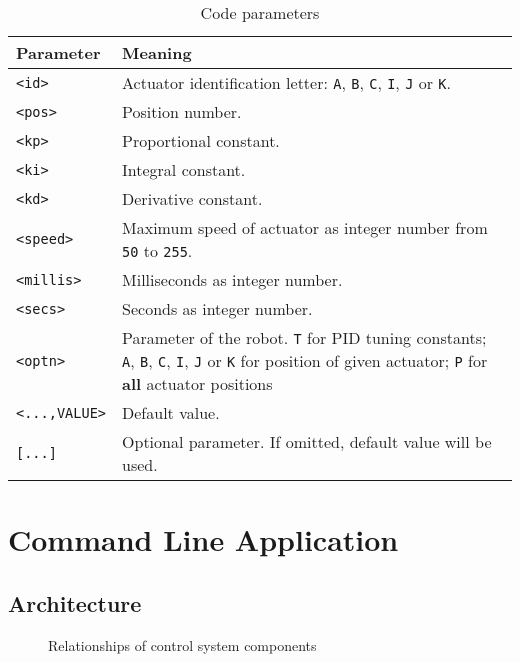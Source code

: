 \begingroup
\setlength{\tabcolsep}{10pt}
\renewcommand{\arraystretch}{1.5}
\begin{table}[h]
    \centering
    \caption{Code parameters}
    \label{tab:code-parameters}
    \begin{tabular}{p{}p{}}
    \toprule
    Parameter & Meaning \\ \midrule
    \texttt{<id>} & Actuator identification letter: \texttt{A}, \texttt{B}, \texttt{C}, \texttt{I}, \texttt{J} or \texttt{K}. \\
    \texttt{<pos>} & Position number. \\
    \texttt{<kp>} & Proportional constant. \\
    \texttt{<ki>} & Integral constant. \\
    \texttt{<kd>} & Derivative constant. \\
    \texttt{<speed>} & Maximum speed of actuator as integer number from \texttt{50} to \texttt{255}. \\
    \texttt{<millis>} & Milliseconds as integer number. \\
    \texttt{<secs>} & Seconds as integer number. \\
    \texttt{<optn>} & Parameter of the robot. \texttt{T} for PID tuning constants; \texttt{A}, \texttt{B}, \texttt{C}, \texttt{I}, \texttt{J} or \texttt{K} for position of given actuator; \texttt{P} for \textbf{all} actuator positions\\
    \texttt{<...,VALUE>} & Default value. \\
    \texttt{[...]} & Optional parameter. If omitted, default value will be used. \\
    \bottomrule
    \end{tabular}
\end{table}
\endgroup

\section{Command Line Application}

\subsection{Architecture}

\begin{figure}[]
    \centering
    
    \caption{Relationships of control system components}
    \label{fig:firmware-uml}
\end{figure}

